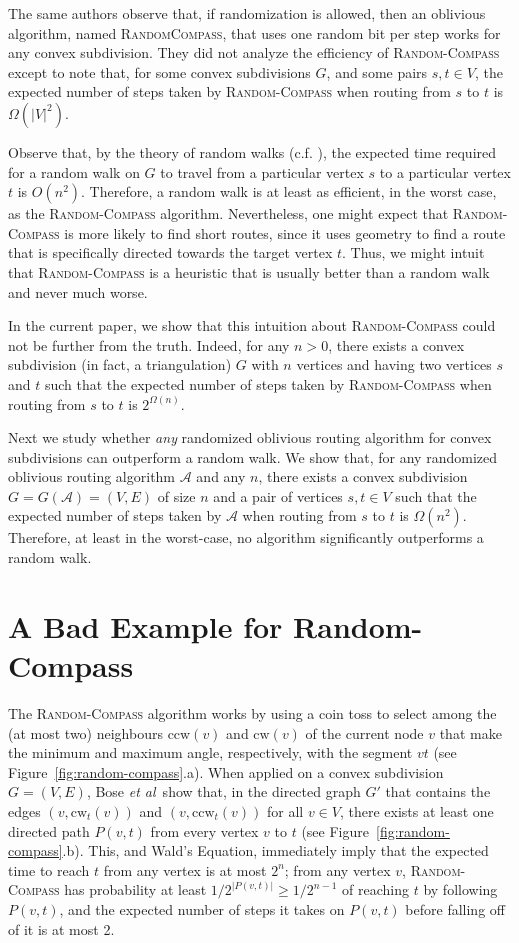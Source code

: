 \documentclass [letterpaper] {patmorin}
\newcommand{\etal}{\emph{et al}}
\newcommand{\ccw}{\mathrm{ccw}}
\newcommand{\cw}{\mathrm{cw}}
\begin{document}
The same authors \cite{bose02,bose04} observe that, if randomization is allowed, then an oblivious algorithm, named \textsc{RandomCompass}, that uses one random bit per step works for any convex subdivision. They did not analyze the efficiency of \textsc{Random-Compass} except to note that, for some convex subdivisions $G$, and some pairs $s,t\in V$, the expected number of steps taken by \textsc{Random-Compass} when routing from $s$ to $t$ is $\Omega(|V|^2)$.

Observe that, by the theory of random walks (c.f. \cite[Theorem~6.6]{mr95}), the expected time required for a random walk on $G$ to travel from a particular vertex $s$ to a particular vertex $t$ is $O(n^2)$.  Therefore, a random walk is at least as efficient, in the worst case, as the \textsc{Random-Compass} algorithm. Nevertheless, one might expect that \textsc{Random-Compass} is more likely to find short routes, since it uses geometry to find a route that is specifically directed towards the target vertex $t$.  Thus, we might intuit that \textsc{Random-Compass} is a heuristic that is usually better than a random walk and never much worse.

In the current paper, we show that this intuition about \textsc{Random-Compass} could not be further from the truth.  Indeed, for any $n>0$, there exists a convex subdivision (in fact, a triangulation) $G$ with $n$ vertices and having two vertices $s$ and $t$ such that the expected number of steps taken by \textsc{Random-Compass} when routing from $s$ to $t$ is $2^{\Omega(n)}$.

Next we study whether \emph{any} randomized oblivious routing algorithm for convex subdivisions can outperform a random walk.  We show that, for any randomized oblivious routing algorithm $\mathcal{A}$ and any $n$, there exists a convex subdivision $G=G(\mathcal{A})=(V,E)$ of size $n$ and a pair of vertices $s,t\in V$ such that the expected number of steps taken by $\mathcal{A}$ when routing from $s$ to $t$ is $\Omega(n^2)$.  Therefore, at least in the worst-case, no algorithm significantly outperforms a random walk.

\section{A Bad Example for Random-Compass}

The \textsc{Random-Compass} algorithm works by using a coin toss to select among the (at most two) neighbours $\ccw(v)$ and $\cw(v)$ of the current node $v$ that make the minimum and maximum angle, respectively, with the segment $vt$ (see Figure~\ref{fig:random-compass}.a). When applied on a convex subdivision $G=(V,E)$, Bose \etal\ show that, in the directed graph $G'$ that contains the edges $(v,\cw_t(v))$ and $(v,\ccw_t(v))$ for all $v\in V$, there exists at least one directed path $P(v,t)$ from every vertex $v$ to $t$ (see Figure~\ref{fig:random-compass}.b).  This, and Wald's Equation, immediately imply that the expected time to reach $t$ from any vertex is at most $2^{n}$; from any vertex $v$, \textsc{Random-Compass} has probability at least $1/2^{|P(v,t)|}\ge 1/2^{n-1}$ of reaching $t$ by following $P(v,t)$, and the expected number of steps it takes on $P(v,t)$ before falling off of it is at most 2.
\end{document}

